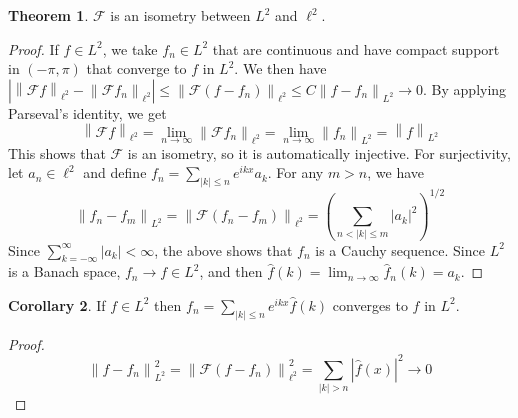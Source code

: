 \documentclass{article}
\newcommand{\norm}[1]{\left\|#1\right\|}
\theoremstyle{definition} %
\newtheorem{thm}{Theorem}
\numberwithin{thm}{section} %
\newtheorem{cor}[thm]{Corollary}
\theoremstyle{definition} %
\begin{document}
\begin{thm}
$\mathcal{F}$ is an isometry between $L^2$ and $\ell^2$.
\end{thm}
\begin{proof}
If $f \in L^2$, we take $f_n \in L^2$ that are continuous and have compact support in $(-\pi, \pi)$ that converge to $f$ in $L^2$. We then have $|\norm{\mathcal{F}f}_{\ell^2} - \norm{\mathcal{F}f_n}_{\ell^2}| \leq \norm{\mathcal{F}(f - f_n)}_{\ell^2} \leq C\norm{f - f_n}_{L^2} \to 0$. By applying Parseval's identity, we get 
\[ \norm{\mathcal{F}f}_{\ell^2} = \lim_{n \to \infty} \norm{\mathcal{F}f_n}_{\ell^2} = \lim_{n \to \infty} \norm{f_n}_{L^2} = \norm{f}_{L^2} \]
This shows that $\mathcal{F}$ is an isometry, so it is automatically injective. For surjectivity, let $a_n \in \ell^2$ and define $f_n = \sum_{|k| \leq n} e^{ikx}a_k$. For any $m > n$, we have 
\[ \norm{f_n - f_m}_{L^2} = \norm{\mathcal{F}(f_n - f_m)}_{\ell^2} = \left(\sum_{n < |k| \leq m} |a_k|^2\right)^{1/2} \]
Since $\sum_{k = -\infty}^\infty |a_k| < \infty$, the above shows that $f_n$ is a Cauchy sequence. Since $L^2$ is a Banach space, $f_n \to f \in L^2$, and then $\hat{f}(k) = \lim_{n \to \infty}\hat{f}_n(k) = a_k$.
\end{proof}

\begin{cor}
If $f \in L^2$ then $f_n = \sum_{|k| \leq n} e^{ikx}\hat{f}(k)$ converges to $f$ in $L^2$.
\end{cor}
\begin{proof}
\[ \norm{f - f_n}_{L^2}^2 = \norm{\mathcal{F}(f - f_n)}_{\ell^2}^2 = \sum_{|k| > n} |\hat{f}(x)|^2 \to 0 \]
\end{proof}
\end{document}
